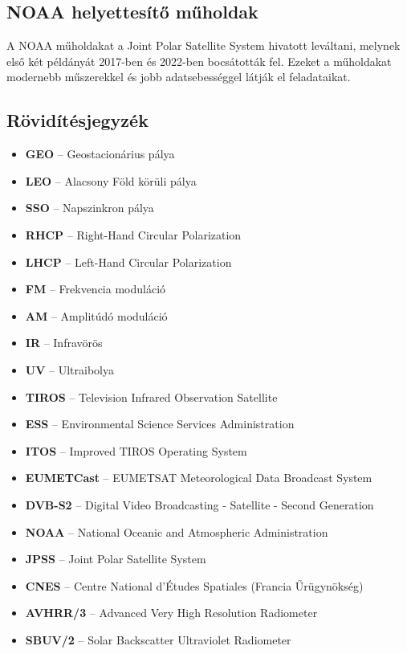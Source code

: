 \documentclass[a4paper,11pt]{article}
\begin{document}
\subsection*{NOAA helyettesítő műholdak}

A NOAA műholdakat a Joint Polar Satellite System hivatott leváltani, melynek első két példányát 2017-ben és 2022-ben bocsátották fel. Ezeket a műholdakat modernebb műszerekkel és jobb adatsebességgel látják el feladataikat.\cite{noaa_jpss4}


\subsection*{Rövidítésjegyzék}

\begin{itemize}
  \item \textbf{GEO} – Geostacionárius pálya
  \item \textbf{LEO} – Alacsony Föld körüli pálya
  \item \textbf{SSO} – Napszinkron pálya
  \item \textbf{RHCP} – Right-Hand Circular Polarization
  \item \textbf{LHCP} – Left-Hand Circular Polarization
  \item \textbf{FM} – Frekvencia moduláció
  \item \textbf{AM} – Amplitúdó moduláció
  \item \textbf{IR} – Infravörös
  \item \textbf{UV} – Ultraibolya
  \item \textbf{TIROS} – Television Infrared Observation Satellite
  \item \textbf{ESS} – Environmental Science Services Administration
  \item \textbf{ITOS} – Improved TIROS Operating System
  \item \textbf{EUMETCast} – EUMETSAT Meteorological Data Broadcast System
  \item \textbf{DVB-S2} – Digital Video Broadcasting - Satellite - Second Generation
  \item \textbf{NOAA} – National Oceanic and Atmospheric Administration
  \item \textbf{JPSS} – Joint Polar Satellite System
  \item \textbf{CNES} – Centre National d'Études Spatiales (Francia Űrügynökség)
  \item \textbf{AVHRR/3} – Advanced Very High Resolution Radiometer
  \item \textbf{SBUV/2} – Solar Backscatter Ultraviolet Radiometer

\end{itemize}
\end{document}
